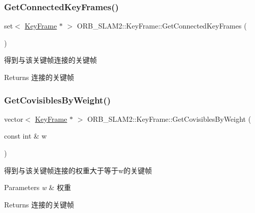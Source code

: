 \subsubsection{\texorpdfstring{Get\+Connected\+Key\+Frames()}{GetConnectedKeyFrames()}}
{\footnotesize\ttfamily set$<$ \mbox{\hyperlink{class_o_r_b___s_l_a_m2_1_1_key_frame}{Key\+Frame}} $\ast$ $>$ O\+R\+B\+\_\+\+S\+L\+A\+M2\+::\+Key\+Frame\+::\+Get\+Connected\+Key\+Frames (\begin{DoxyParamCaption}{ }\end{DoxyParamCaption})}



得到与该关键帧连接的关键帧 

\begin{DoxyReturn}{Returns}
连接的关键帧 
\end{DoxyReturn}
\mbox{\label{class_o_r_b___s_l_a_m2_1_1_key_frame_a7047bffbf130b00dd0270df99874f8a1}} 
\subsubsection{\texorpdfstring{Get\+Covisibles\+By\+Weight()}{GetCovisiblesByWeight()}}
{\footnotesize\ttfamily vector$<$ \mbox{\hyperlink{class_o_r_b___s_l_a_m2_1_1_key_frame}{Key\+Frame}} $\ast$ $>$ O\+R\+B\+\_\+\+S\+L\+A\+M2\+::\+Key\+Frame\+::\+Get\+Covisibles\+By\+Weight (\begin{DoxyParamCaption}\item[{const int \&}]{w }\end{DoxyParamCaption})}



得到与该关键帧连接的权重大于等于w的关键帧 


\begin{DoxyParams}{Parameters}
{\em w} & 权重 \\
\hline
\end{DoxyParams}
\begin{DoxyReturn}{Returns}
连接的关键帧 
\end{DoxyReturn}
\mbox{\label{class_o_r_b___s_l_a_m2_1_1_key_frame_aa057f2902cc7910343c5d452d33cb39f}} 
